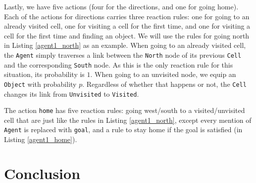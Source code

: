 \documentclass[runningheads]{llncs}
\begin{document}
Lastly, we have five actions (four for the directions, and one for
going home). Each of the actions for directions carries three reaction
rules: one for going to an already visited cell, one for visiting a
cell for the first time, and one for visiting a cell for the
first time and finding an object. We will use the rules for going north
in Listing \ref{agent1_north} as an example. When going to an already visited
cell, the \texttt{Agent} simply traverses a link between the \texttt{North} node
of its previous \texttt{Cell} and the corresponding \texttt{South} node. As this
is the only reaction rule for this situation, its probability is $1$. When
going to an unvisited node, we equip an \texttt{Object} with probability $p$.
Regardless of whether that happens or not, the \texttt{Cell} changes its
link from \texttt{Unvisited} to \texttt{Visited}.



The action \texttt{home} has five reaction rules: going west/south to a
visited/unvisited cell that are just like the rules in Listing
\ref{agent1_north}, except every mention of \texttt{Agent} is replaced with
\texttt{goal}, and a rule to stay home if the goal is satisfied (in Listing
\ref{agent1_home}).

\section{Conclusion}



\end{document}
